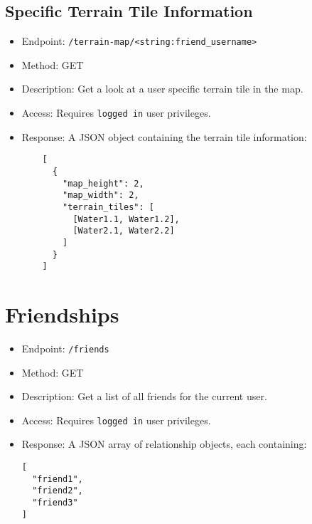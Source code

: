\documentclass[12pt]{article}
\begin{document}
\subsection{Specific Terrain Tile Information}
\begin{itemize}
    \item Endpoint: \texttt{/terrain-map/<string:friend\_username>}
    \item Method: GET
    \item Description: Get a look at a user specific terrain tile in the map.
    \item Access: Requires \texttt{logged in} user privileges.
    \item Response: A JSON object containing the terrain tile information:
    \begin{verbatim}
    [
      {
        "map_height": 2,
        "map_width": 2,
        "terrain_tiles": [
          [Water1.1, Water1.2],
          [Water2.1, Water2.2]
        ]
      }
    ]
    \end{verbatim}
\end{itemize}

\section{Friendships}
\begin{itemize}
    \item Endpoint: \texttt{/friends}
    \item Method: GET
    \item Description: Get a list of all friends for the current user.
    \item Access: Requires \texttt{logged in} user privileges.
    \item Response: A JSON array of relationship objects, each containing:
    \begin{verbatim}
[
  "friend1",
  "friend2",
  "friend3"
]
    \end{verbatim}
\end{itemize}
\end{document}
